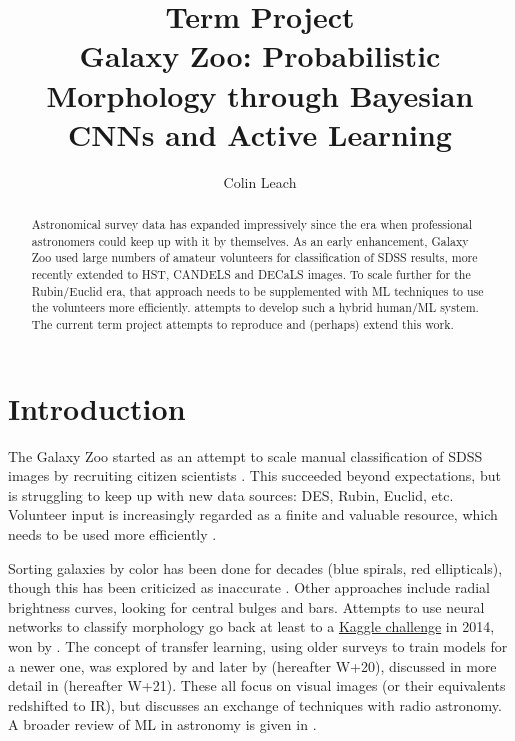 \documentclass[preprint]{aastex631}
\begin{document}
\title{Term Project \\Galaxy Zoo: Probabilistic Morphology through Bayesian CNNs and Active Learning}

\author[0000-0003-3608-1546]{Colin Leach}

\begin{abstract}

Astronomical survey data has expanded impressively since the era when professional astronomers could keep up with it by themselves. As an early enhancement, Galaxy Zoo used large numbers of amateur volunteers for classification of SDSS results, more recently extended to HST, CANDELS and DECaLS images. To scale further for the Rubin/Euclid era, that approach needs to be supplemented with ML techniques to use the volunteers more efficiently. \citet{walmsley_galaxy_2020} attempts to develop such a hybrid human/ML system. The current term project attempts to reproduce and (perhaps) extend this work.\\

\end{abstract} 

\section{Introduction} \label{sec:intro}


The Galaxy Zoo started as an attempt to scale manual classification of SDSS images by recruiting citizen scientists \citep{2008MNRAS.389.1179L, lintott_crowd_2019}. This succeeded beyond expectations, but is struggling to keep up with new data sources: DES, Rubin, Euclid, etc. Volunteer input is increasingly regarded as a finite and valuable resource, which needs to be used more efficiently \citep{2020IAUS..341...99D}.

Sorting galaxies by color has been done for decades (blue spirals, red ellipticals), though this has been criticized as inaccurate \citep{smethurst_quantifying_2022}. Other approaches include radial brightness curves, looking for central bulges and bars. Attempts to use neural networks to classify morphology go back at least to a \href{https://www.kaggle.com/c/galaxy-zoo-the-galaxy-challenge}{Kaggle challenge} in 2014, won by \citet{2015MNRAS.450.1441D}. The concept of transfer learning, using older surveys to train models for a newer one, was explored by \citet{2019MNRAS.484...93D} and later by \citet{walmsley_galaxy_2020} (hereafter W+20), discussed in more detail in \citet{2021MNRAS} (hereafter W+21). These all focus on visual images (or their equivalents redshifted to IR), but \citet{2021arXiv211104353F} discusses an exchange of techniques with radio astronomy. A broader review of ML in astronomy is given in \citet{2020WDMKD..10.1349F}.
\end{document}
